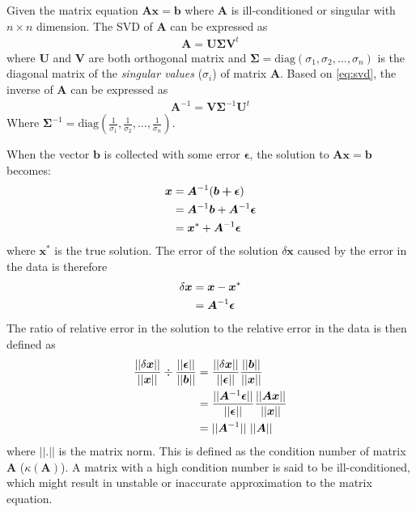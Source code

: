 \documentclass[12pt]{scrbook}
\begin{document}
Given the matrix equation $\boldsymbol{Ax}=\boldsymbol{b}$ where $\boldsymbol{A}$ is ill-conditioned or singular with $n\times n$ dimension.
The \gls{SVD} of $\boldsymbol{A}$ can be expressed as 				
\begin{align}
\boldsymbol{A} = \boldsymbol{U\Sigma V}^t
\label{eq:svd}
\end{align}
where $\boldsymbol{U}$ and $\boldsymbol{V}$ are both orthogonal matrix and $\boldsymbol{\Sigma}=\mathrm{diag}(\sigma_1,\sigma_2,\dots,\sigma_n)$ is the diagonal matrix of the \emph{singular values} ($\sigma_i$) of matrix $\boldsymbol{A}$.
Based on \cref{eq:svd}, the inverse of $\boldsymbol{A}$ can be expressed as
\begin{align}
\boldsymbol{A}^{-1}= \boldsymbol{V\Sigma}^{-1}\boldsymbol{U}^t
\label{eq:svdInverse}
\end{align}
Where $
\boldsymbol{\Sigma}^{-1} = \mathrm{diag}(\frac{1}{\sigma_1},\frac{1}{\sigma_2},\dots,\frac{1}{\sigma_n})$.

When the vector $\boldsymbol{b}$ is collected with some error $\boldsymbol{\epsilon}$, the solution to $\boldsymbol{Ax}=\boldsymbol{b}$ becomes:
\begin{align}
\boldsymbol{x}&=\boldsymbol{A}^{-1}(\boldsymbol{b+\epsilon}) \notag\\
&= \boldsymbol{A}^{-1}\boldsymbol{b}+\boldsymbol{A}^{-1}\boldsymbol{\epsilon}\notag\\
&= \boldsymbol{x}^*+\boldsymbol{A}^{-1}\boldsymbol{\epsilon}
\end{align}
where $\boldsymbol{x}^*$ is the true solution.
The error of the solution $\delta \boldsymbol{x}$ caused by the error in the data is therefore
\begin{align}
\delta \boldsymbol{x}&=\boldsymbol{x}-\boldsymbol{x}^*\notag\\ 
&=\boldsymbol{A}^{-1}\boldsymbol{\epsilon}
\end{align}
The ratio of relative error in the solution to the relative error in the data is then defined as
\begin{align}
\frac{||\delta \boldsymbol{x}||}{||\boldsymbol{x}||}\div\frac{||\boldsymbol{\epsilon}|| }{||\boldsymbol{b}||}
&=\frac{||\delta \boldsymbol{x}||}{||\boldsymbol{\epsilon}|| } \frac{||\boldsymbol{b}|| }{||\boldsymbol{x}||} \notag\\ 
&= \frac{||\boldsymbol{A}^{-1}\boldsymbol{\epsilon}||}{||\boldsymbol{\epsilon}|| } \frac{||\boldsymbol{Ax}|| }{||\boldsymbol{x}||} \notag\\
&= ||\boldsymbol{A}^{-1}||\ ||\boldsymbol{A}||
\end{align}
where $||.||$ is the matrix norm.
This is defined as the condition number of matrix $\boldsymbol{A}$  ($\kappa(\boldsymbol{A})$).
A matrix with a high condition number is said to be ill-conditioned, which might result in unstable or inaccurate approximation to the matrix equation.
\end{document}
